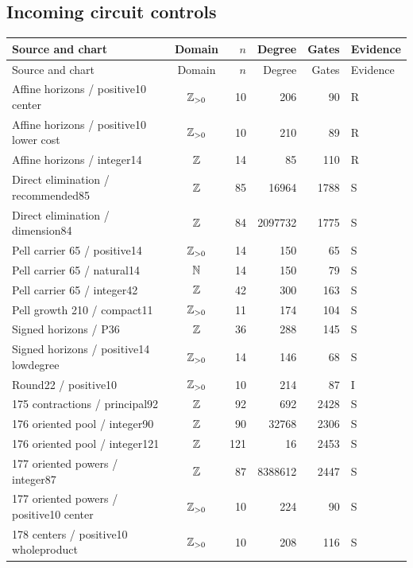 \subsection{Incoming circuit controls}
\begingroup\small\setlength{\tabcolsep}{5pt}
\begin{longtable}{@{}p{66mm}crrrl@{}}
\toprule Source and chart & Domain & $n$ & Degree & Gates & Evidence\\\midrule\endfirsthead
\toprule Source and chart & Domain & $n$ & Degree & Gates & Evidence\\\midrule\endhead
\bottomrule\endfoot
Affine horizons / positive10 center & $\mathbb Z_{>0}$ & 10 & 206 & 90 & R\\
Affine horizons / positive10 lower cost & $\mathbb Z_{>0}$ & 10 & 210 & 89 & R\\
Affine horizons / integer14 & $\mathbb Z$ & 14 & 85 & 110 & R\\
Direct elimination / recommended85 & $\mathbb Z$ & 85 & 16964 & 1788 & S\\
Direct elimination / dimension84 & $\mathbb Z$ & 84 & 2097732 & 1775 & S\\
Pell carrier 65 / positive14 & $\mathbb Z_{>0}$ & 14 & 150 & 65 & S\\
Pell carrier 65 / natural14 & $\mathbb N$ & 14 & 150 & 79 & S\\
Pell carrier 65 / integer42 & $\mathbb Z$ & 42 & 300 & 163 & S\\
Pell growth 210 / compact11 & $\mathbb Z_{>0}$ & 11 & 174 & 104 & S\\
Signed horizons / P36 & $\mathbb Z$ & 36 & 288 & 145 & S\\
Signed horizons / positive14 lowdegree & $\mathbb Z_{>0}$ & 14 & 146 & 68 & S\\
Round22 / positive10 & $\mathbb Z_{>0}$ & 10 & 214 & 87 & I\\
175 contractions / principal92 & $\mathbb Z$ & 92 & 692 & 2428 & S\\
176 oriented pool / integer90 & $\mathbb Z$ & 90 & 32768 & 2306 & S\\
176 oriented pool / integer121 & $\mathbb Z$ & 121 & 16 & 2453 & S\\
177 oriented powers / integer87 & $\mathbb Z$ & 87 & 8388612 & 2447 & S\\
177 oriented powers / positive10 center & $\mathbb Z_{>0}$ & 10 & 224 & 90 & S\\
178 centers / positive10 wholeproduct & $\mathbb Z_{>0}$ & 10 & 208 & 116 & S\\
\end{longtable}\endgroup
